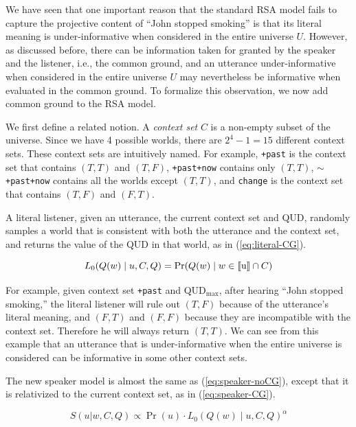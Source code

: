 We have seen that one important reason that the standard RSA model fails to 
 capture the projective content of ``John stopped smoking'' is that its literal
 meaning is under-informative when considered in the entire universe $U$.
However, as discussed before, there can be information taken for granted by the
 speaker and the listener, i.e., the common ground, 
and an utterance under-informative when considered in the entire universe $U$ may 
 nevertheless be informative when evaluated in the common ground.
To formalize this observation, we now add common ground to the RSA model.

We first define a related notion. 
A \emph{context set} \cite{Stalnaker1974:Pragmatic-Presuppositions} $C$ is a non-empty subset of the universe.
Since we have 4 possible worlds, there are $2^4-1=15$ different context sets.
These context sets are intuitively named. 
For example, \verb=+past= is the context set
 that contains $(T, T)$ and $(T, F)$,
\verb=+past+now= contains only $(T, T)$,
$\sim$\verb=+past+now= contains all the worlds except $(T, T)$, 
and \verb=change= is the context set that contains $(T, F)$ 
 and $(F, T)$.

A literal listener, given an utterance, the current context set and QUD, 
 randomly samples a world that is consistent with both the utterance and 
 the context set, and returns the value of the QUD in that world, as in  
 (\ref{eq:literal-CG}).

\begin{equation}
L_0(Q(w) \mid u, C, Q) = \Pr(Q(w) \mid w \in \llbracket \text{u} \rrbracket \cap C) \label{eq:literal-CG}
\end{equation}

For example, given context set \verb=+past= and QUD$_\text{max}$, 
 after hearing ``John stopped smoking,'' the literal listener will rule out 
 $(T, F)$ because of the utterance's literal meaning, and 
 $(F, T)$ and $(F, F)$ because 
 they are incompatible with the context set.
Therefore he will always return $(T, T)$.
We can see from this example that an utterance that is under-informative 
 when the entire universe is considered can be informative in some other 
 context sets.

The new speaker model is almost the same as (\ref{eq:speaker-noCG}), except that 
 it is relativized to the current context set, as in (\ref{eq:speaker-CG}).
 
\begin{equation}
S(u | w, C, Q) \propto \Pr(u) \cdot L_0(Q(w) \mid u, C, Q)^\alpha \label{eq:speaker-CG}
\end{equation}
 
